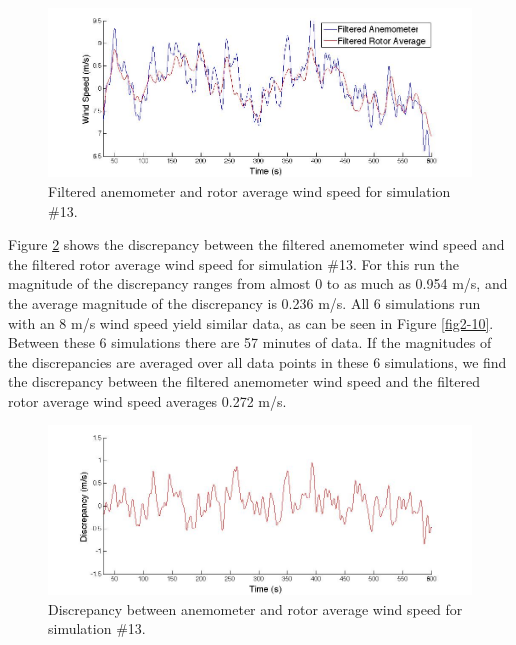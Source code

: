 \begin{figure}[htbp]
	\centering
		\includegraphics[width = \linewidth]{Figures/ch2Figures/fig2-8.jpg}
		
	\caption{Filtered anemometer and rotor average wind speed for simulation \#13.}
	\label{fig2-8}
\end{figure}

Figure \ref{fig2-9} shows the discrepancy between the filtered anemometer wind speed and the filtered rotor average wind speed for simulation \#13. For this run the magnitude of the discrepancy ranges from almost 0 to as much as 0.954 m/s, and the average magnitude of the discrepancy is 0.236 m/s. All 6 simulations run with an 8 m/s wind speed yield similar data, as can be seen in Figure \ref{fig2-10}. Between these 6 simulations there are 57 minutes of data. If the magnitudes of the discrepancies are averaged over all data points in these 6 simulations, we find the discrepancy between the filtered anemometer wind speed and the filtered rotor average wind speed averages 0.272 m/s.

\begin{figure}[htbp]
	\centering
		\includegraphics[width = \linewidth]{Figures/ch2Figures/fig2-9.jpg}
		
	\caption{Discrepancy between anemometer and rotor average wind speed for simulation \#13.}
	\label{fig2-9}
\end{figure}

